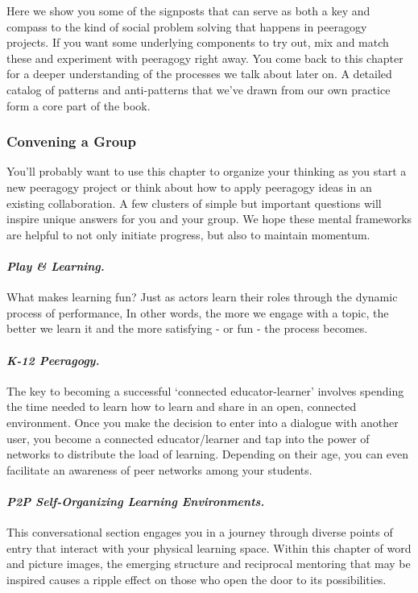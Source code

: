 \noindent Here we show you some of the signposts that can serve as
both a key and compass to the kind of social problem solving that
happens in peeragogy projects. If you want some underlying components
to try out, mix and match these and experiment with peeragogy right
away. You come back to this chapter for a deeper understanding of the
processes we talk about later on. A detailed catalog of patterns and
anti-patterns that we've drawn from our own practice form a core part
of the book.

\subsubsection{Convening a Group}

\noindent You'll probably want to use this chapter to organize your thinking as
you start a new peeragogy project or think about how to apply peeragogy
ideas in an existing collaboration. A few clusters of simple but
important questions will inspire unique answers for you and your group.
We hope these mental frameworks are helpful to not only initiate
progress, but also to maintain momentum.

 \paragraph{\emph{Play \& Learning.}} What
makes learning fun? Just as actors learn their roles through the dynamic
process of performance, In other words, the more we engage with a topic,
the better we learn it and the more satisfying - or fun - the process
becomes.

\paragraph{\emph{K-12 Peeragogy.}} The key to becoming a successful
`connected educator-learner' involves spending the time needed to learn
how to learn and share in an open, connected environment. Once you make
the decision to enter into a dialogue with another user, you become a
connected educator/learner and tap into the power of networks to
distribute the load of learning. Depending on their age, you can even
facilitate an awareness of peer networks among your students.

\paragraph{\emph{P2P Self-Organizing Learning Environments.}} This conversational
section engages you in a journey through diverse points of entry that
interact with your physical learning space. Within this chapter of word
and picture images, the emerging structure and reciprocal mentoring that
may be inspired causes a ripple effect on those who open the door to its
possibilities.

